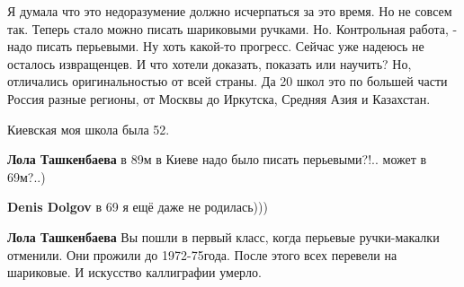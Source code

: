 \begin{itemize}
Я думала что это недоразумение должно исчерпаться за это время. Но не совсем
так. Теперь стало можно писать шариковыми ручками. Но. Контрольная работа, -
надо писать перьевыми. Ну хоть какой-то прогресс. Сейчас уже надеюсь не
осталось извращенцев. И что хотели доказать, показать или научить? Но,
отличались оригинальностью от всей страны. Да 20 школ это по большей части
Россия разные регионы, от Москвы до Иркутска, Средняя Азия и Казахстан.

Киевская моя школа была 52.

\begin{itemize}
 
\textbf{Лола Ташкенбаева} в 89м в Киеве надо было писать перьевыми?!..
может в 69м?..)

\begin{itemize}
 
\textbf{Denis Dolgov} в 69 я ещё даже не родилась)))
\end{itemize}

 
\textbf{Лола Ташкенбаева} Вы пошли в первый класс, когда перьевые ручки-макалки
отменили. Они прожили до 1972-75года. После этого всех перевели на шариковые. И
искусство каллиграфии умерло.

\end{itemize}

\end{itemize}

